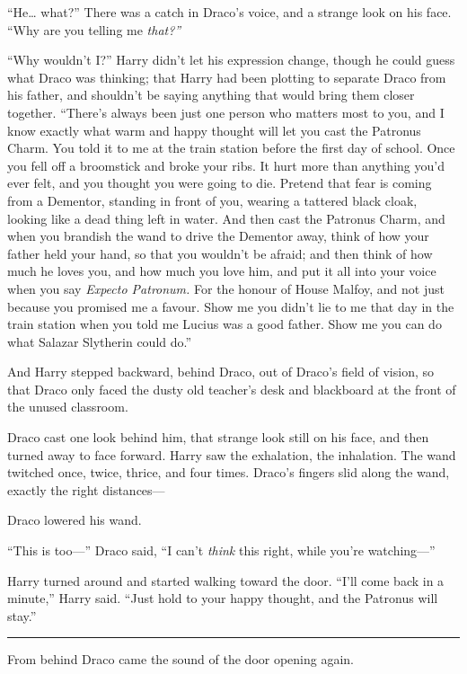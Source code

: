 ``He\ldots{} what?'' There was a catch in Draco's voice, and a strange
look on his face. ``Why are you telling me \emph{that?''}

``Why wouldn't I?'' Harry didn't let his expression change, though he
could guess what Draco was thinking; that Harry had been plotting to
separate Draco from his father, and shouldn't be saying anything that
would bring them closer together. ``There's always been just one person
who matters most to you, and I know exactly what warm and happy thought
will let you cast the Patronus Charm. You told it to me at the train
station before the first day of school. Once you fell off a broomstick
and broke your ribs. It hurt more than anything you'd ever felt, and you
thought you were going to die. Pretend that fear is coming from a
Dementor, standing in front of you, wearing a tattered black cloak,
looking like a dead thing left in water. And then cast the Patronus
Charm, and when you brandish the wand to drive the Dementor away, think
of how your father held your hand, so that you wouldn't be afraid; and
then think of how much he loves you, and how much you love him, and put
it all into your voice when you say \emph{Expecto Patronum.} For the
honour of House Malfoy, and not just because you promised me a favour.
Show me you didn't lie to me that day in the train station when you told
me Lucius was a good father. Show me you can do what Salazar Slytherin
could do.''

And Harry stepped backward, behind Draco, out of Draco's field of
vision, so that Draco only faced the dusty old teacher's desk and
blackboard at the front of the unused classroom.

Draco cast one look behind him, that strange look still on his face, and
then turned away to face forward. Harry saw the exhalation, the
inhalation. The wand twitched once, twice, thrice, and four times.
Draco's fingers slid along the wand, exactly the right distances---

Draco lowered his wand.

``This is too---'' Draco said, ``I can't \emph{think} this right, while
you're watching---''

Harry turned around and started walking toward the door. ``I'll come
back in a minute,'' Harry said. ``Just hold to your happy thought, and
the Patronus will stay.''

\begin{center}\rule{3in}{0.4pt}\end{center}

From behind Draco came the sound of the door opening again.

